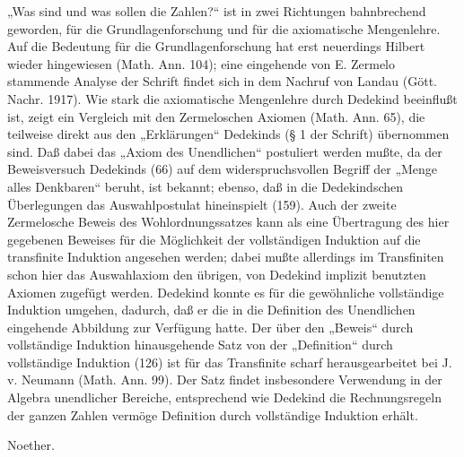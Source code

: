 \documentclass[11pt]{article}
\begin{document}
\noindent „Was sind und was sollen die Zahlen?“ ist in zwei Richtungen bahnbrechend geworden, für die Grundlagenforschung und für die axiomatische Mengenlehre. Auf die Bedeutung für die Grundlagenforschung hat erst neuerdings Hilbert wieder hingewiesen (Math. Ann. 104); eine eingehende von E. Zermelo stammende Analyse der Schrift findet sich in dem Nachruf von Landau (Gött. Nachr. 1917). Wie stark die axiomatische Mengenlehre durch Dedekind beeinflußt ist, zeigt ein Vergleich mit den Zermeloschen Axiomen (Math. Ann. 65), die teilweise direkt aus den „Erklärungen“ Dedekinds (\S{} 1 der Schrift) übernommen sind. Daß dabei das „Axiom des Unendlichen“ postuliert werden mußte, da der Beweisversuch Dedekinds (66) auf dem widerspruchsvollen Begriff der „Menge alles Denkbaren“ beruht, ist bekannt; ebenso, daß in die Dedekindschen Überlegungen das Auswahlpostulat hineinspielt (159). Auch der zweite Zermelosche Beweis des Wohlordnungssatzes kann als eine Übertragung des hier gegebenen Beweises für die Möglichkeit der vollständigen Induktion auf die transfinite Induktion angesehen werden; dabei mußte allerdings im Transfiniten schon hier das Auswahlaxiom den übrigen, von Dedekind implizit benutzten Axiomen zugefügt werden. Dedekind konnte es für die gewöhnliche vollständige Induktion umgehen, dadurch, daß er die in die Definition des Unendlichen eingehende Abbildung zur Verfügung hatte. Der über den „Beweis“ durch vollständige Induktion hinausgehende Satz von der „Definition“ durch vollständige Induktion (126) ist für das Transfinite scharf herausgearbeitet bei J. v. Neumann (Math. Ann. 99). Der Satz findet insbesondere Verwendung in der Algebra unendlicher Bereiche, entsprechend wie Dedekind die Rechnungsregeln der ganzen Zahlen vermöge Definition durch vollständige Induktion erhält.

\begin{flushright}Noether.\end{flushright}
\end{document}
